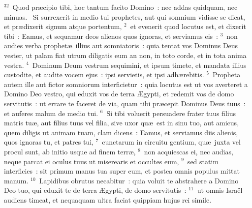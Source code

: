 ${}^{32}$~Quod pr\ae cipio tibi, hoc tantum facito Domino~: nec addas quidquam, nec minuas.
~\lettrine[lines=10,image=true,loversize=0.05,lraise=-0.03]{S}{}i surrexerit in medio tui prophetes, aut qui somnium vidisse se dicat, et pr\ae dixerit signum atque portentum,
${}^{2}$~et evenerit quod locutus est, et dixerit tibi~: Eamus, et sequamur deos alienos quos ignoras, et serviamus eis~:
${}^{3}$~non audies verba prophet\ae\ illius aut somniatoris~: quia tentat vos Dominus Deus vester, ut palam fiat utrum diligatis eum an non, in toto corde, et in tota anima vestra.
${}^{4}$~Dominum Deum vestrum sequimini, et ipsum timete, et mandata illius custodite, et audite vocem ejus~: ipsi servietis, et ipsi adh\ae rebitis.
${}^{5}$~Propheta autem ille aut fictor somniorum interficietur~: quia locutus est ut vos averteret a Domino Deo vestro, qui eduxit vos de terra \AE gypti, et redemit vos de domo servitutis~: ut errare te faceret de via, quam tibi pr\ae cepit Dominus Deus tuus~: et auferes malum de medio tui.
${}^{6}$~Si tibi voluerit persuadere frater tuus filius matris tu\ae , aut filius tuus vel filia, sive uxor qu\ae\ est in sinu tuo, aut amicus, quem diligis ut animam tuam, clam dicens~: Eamus, et serviamus diis alienis, quos ignoras tu, et patres tui,
${}^{7}$~cunctarum in circuitu gentium, qu\ae\ juxta vel procul sunt, ab initio usque ad finem terr\ae ,
${}^{8}$~non acquiescas ei, nec audias, neque parcat ei oculus tuus ut miserearis et occultes eum,
${}^{9}$~sed statim interficies~: sit primum manus tua super eum, et postea omnis populus mittat manum.
${}^{10}$~Lapidibus obrutus necabitur~: quia voluit te abstrahere a Domino Deo tuo, qui eduxit te de terra \AE gypti, de domo servitutis~:
${}^{11}$~ut omnis Isra\"el audiens timeat, et nequaquam ultra faciat quippiam hujus rei simile.


